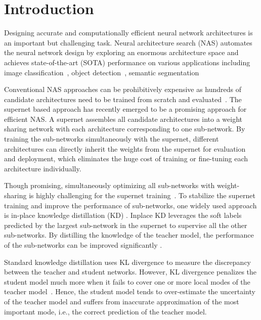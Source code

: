 \documentclass{article}
\begin{document}
\section{Introduction}

Designing accurate and computationally efficient neural network architectures is an important but challenging task. Neural architecture search (NAS) automates the neural network design by exploring an enormous architecture space and achieves state-of-the-art (SOTA) performance on various applications including image classification~\citep{zoph2016neural, zoph2018learning}, object detection~\citep{ghiasi2019fpn}, semantic segmentation~\citep{zhang2019customizable} 

Conventional NAS approaches can be prohibitively expensive as hundreds of candidate architectures need to be trained from scratch and evaluated~\citep[e.g.,][]{tan2019mnasnet, zoph2018learning}. The supernet based approach has recently emerged to be a promising approach for efficient NAS. A supernet assembles all candidate architectures into a weight sharing network with each architecture corresponding to one sub-network. By training the sub-networks simultaneously with the supernet, different architectures can directly inherit the weights from the supernet for evaluation and deployment, which eliminates the huge cost of training or fine-tuning each architecture individually.

Though promising, simultaneously optimizing all sub-networks with weight-sharing is highly challenging for the supernet training~\citep[e.g.,][]{yu2020bignas, cai2019once}.
To stabilize the supernet training and improve the performance of sub-networks, one widely used approach is in-place knowledge distillation (KD) \citep{yu2019universally}. 
Inplace KD leverages the soft labels predicted by the largest sub-network in the supernet to supervise all the other sub-networks. By distilling the knowledge of the teacher model, the performance of the sub-networks can be improved significantly \citep{yu2019universally, yu2020bignas}. 

Standard knowledge distillation uses KL divergence to measure the discrepancy between the teacher and student networks. However, KL divergence penalizes the student model much more when it fails to cover one or more local modes of the teacher model~\citep{murphy2012machine}. Hence, the student model tends to over-estimate the uncertainty of the teacher model and suffers from inaccurate approximation of the most important mode, i.e., the correct prediction of the teacher model. 
\end{document}
